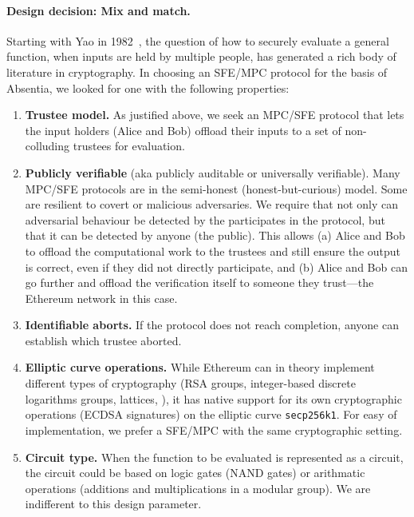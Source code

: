 \paragraph{Design decision: Mix and match.} Starting with Yao in 1982~\cite{Yao82}, the question of how to securely evaluate a general function, when inputs are held by multiple people, has generated a rich body of literature in cryptography. In choosing an SFE/MPC protocol for the basis of Absentia, we looked for one with the following properties:

\begin{enumerate}
\item \textbf{Trustee model.} As justified above, we seek an MPC/SFE protocol that lets the input holders (\eg Alice and Bob) offload their inputs to a set of non-colluding trustees for evaluation. 
\item \textbf{Publicly verifiable} (aka publicly auditable or universally verifiable). Many MPC/SFE protocols are in the semi-honest (\ie honest-but-curious) model. Some are resilient to covert or malicious adversaries. We require that not only can adversarial behaviour  be detected by the participates in the protocol, but that it can be detected by anyone (\ie the public). This allows (a) Alice and Bob to offload the computational work to the trustees and still ensure the output is correct, even if they did not directly participate, and (b) Alice and Bob can go further and offload the verification itself to someone they trust---the Ethereum network in this case.
\item \textbf{Identifiable aborts.} If the protocol does not reach completion, anyone can establish which trustee aborted.
\item \textbf{Elliptic curve operations.} While Ethereum can in theory implement different types of cryptography (RSA groups, integer-based discrete logarithms groups, lattices, \etc), it has native support for its own cryptographic operations (ECDSA signatures) on the elliptic curve \texttt{secp256k1}. For easy of implementation, we prefer a SFE/MPC with the same cryptographic setting. 
\item \textbf{Circuit type.} When the function to be evaluated is represented as a circuit, the circuit could be based on logic gates (\ie NAND gates) or arithmatic operations (\eg additions and multiplications in a modular group). We are indifferent to this design parameter.
\end{enumerate}


